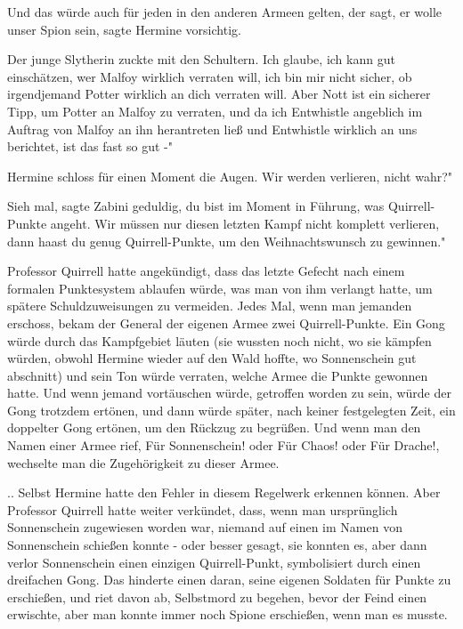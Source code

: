 \glqq Und das würde auch für jeden in den anderen Armeen gelten, der sagt, er
wolle unser Spion sein\grqq{}, sagte Hermine vorsichtig.

Der junge Slytherin zuckte mit den Schultern. \glqq Ich glaube, ich kann gut
einschätzen, wer Malfoy wirklich verraten will, ich bin mir nicht sicher, ob
irgendjemand Potter wirklich an dich verraten will. Aber Nott ist ein sicherer
Tipp, um Potter an Malfoy zu verraten, und da ich Entwhistle angeblich im
Auftrag von Malfoy an ihn herantreten ließ und Entwhistle wirklich an uns
berichtet, ist das fast so gut -"

Hermine schloss für einen Moment die Augen. \glqq Wir werden verlieren, nicht
wahr?"

\glqq Sieh mal\grqq{}, sagte Zabini geduldig, \glqq du bist im Moment in
Führung, was Quirrell-Punkte angeht. Wir müssen nur diesen letzten Kampf nicht
komplett verlieren, dann haast du genug Quirrell-Punkte, um den Weihnachtswunsch
zu gewinnen."

Professor Quirrell hatte angekündigt, dass das letzte Gefecht nach einem
formalen Punktesystem ablaufen würde, was man von ihm verlangt hatte, um spätere
Schuldzuweisungen zu vermeiden. Jedes Mal, wenn man jemanden erschoss, bekam der
General der eigenen Armee zwei Quirrell-Punkte. Ein Gong würde durch das
Kampfgebiet läuten (sie wussten noch nicht, wo sie kämpfen würden, obwohl
Hermine wieder auf den Wald hoffte, wo Sonnenschein gut abschnitt) und sein Ton
würde verraten, welche Armee die Punkte gewonnen hatte. Und wenn jemand
vortäuschen würde, getroffen worden zu sein, würde der Gong trotzdem ertönen,
und dann würde später, nach keiner festgelegten Zeit, ein doppelter Gong
ertönen, um den Rückzug zu begrüßen. Und wenn man den Namen einer Armee rief,
\glqq Für Sonnenschein!\grqq{} oder \glqq Für Chaos!\grqq{} oder \glqq Für
Drache!\grqq{}, wechselte man die Zugehörigkeit zu dieser Armee.

.. Selbst Hermine hatte den Fehler in diesem Regelwerk erkennen können. Aber
Professor Quirrell hatte weiter verkündet, dass, wenn man ursprünglich
Sonnenschein zugewiesen worden war, niemand auf einen im Namen von Sonnenschein
schießen konnte - oder besser gesagt, sie konnten es, aber dann verlor
Sonnenschein einen einzigen Quirrell-Punkt, symbolisiert durch einen dreifachen
Gong. Das hinderte einen daran, seine eigenen Soldaten für Punkte zu erschießen,
und riet davon ab, Selbstmord zu begehen, bevor der Feind einen erwischte, aber
man konnte immer noch Spione erschießen, wenn man es musste.

